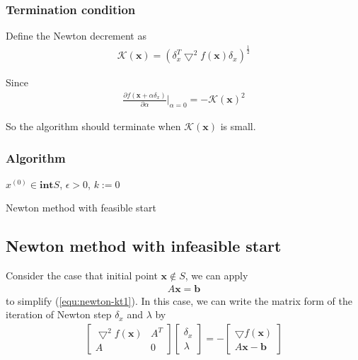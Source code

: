 \subsubsection{Termination condition}
Define the Newton decrement as
\begin{align}
    \mathcal{K}(\mathbf{x}) = (\delta^{T}_x \bigtriangledown^2 f(\mathbf{x})
    \delta_x)^{\frac{1}{2}} 
\end{align}

Since
\begin{align}
    \frac{\partial f(\mathbf{x} + \alpha \delta_x)}{\partial \alpha} |_{\alpha=0}
    = - \mathcal{K}(\mathbf{x})^2
\end{align}

So the algorithm should terminate when $\mathcal{K}(\mathbf{x})$ is small.
\subsubsection{Algorithm}

\begin{algorithm}[H]
    \SetAlgoLined
     $x^{(0)} \in \mathbf{int}S$, $\epsilon > 0$, $k:= 0$\;
     \caption{Newton method with feasible start}
\end{algorithm}

\subsection{Newton method with infeasible start}
Consider the case that initial point $\mathbf{x} \notin S$,
we can apply
\begin{align}
    A\mathbf{x} = \mathbf{b}
\end{align}
to simplify (\ref{equ:newton-kt1}).
In this case, we can write the matrix form of the iteration
of Newton step $\delta_x$ and $\lambda$ by
\begin{align}
    \begin{bmatrix}
        \bigtriangledown^2 f(\mathbf{x}) &A^T \\
        A & 0
    \end{bmatrix}
    \begin{bmatrix}
        \delta_x \\
        \lambda
    \end{bmatrix} = -
    \begin{bmatrix}
        \bigtriangledown f(\mathbf{x}) \\
        A\mathbf{x} - \mathbf{b}
    \end{bmatrix}
    \label{equ:newton-update1}
\end{align}

